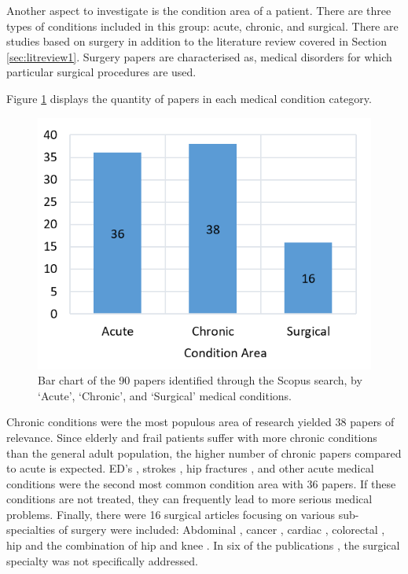 \documentclass[../thesis.tex]{subfiles}
\begin{document}
Another aspect to investigate is the condition area of a patient. There are three types of conditions included in this group: acute, chronic, and surgical. There are studies based on surgery in addition to the literature review covered in Section \ref{sec:litreview1}. Surgery papers are characterised as, medical disorders for which particular surgical procedures are used.

Figure \ref{fig:litreview2-condition} displays the quantity of papers in each medical condition category.

\begin{figure}[h!]
    \centering
    \includegraphics[scale=1]{Chapters/Chapter2/Figures3/2lrmedcon.png}
    \caption{Bar chart of the 90 papers identified through the Scopus search, by `Acute', `Chronic', and `Surgical' medical conditions.}
    \label{fig:litreview2-condition}
\end{figure}

Chronic conditions were the most populous area of research yielded 38 papers of relevance. Since elderly and frail patients suffer with more chronic conditions than the general adult population, the higher number of chronic papers compared to acute is expected. ED's \cite{Bahrmann2018}, strokes \cite{Sommerfeld2011}, hip fractures \cite{Rajamaki2020}, and other acute medical conditions were the second most common condition area with 36 papers. If these conditions are not treated, they can frequently lead to more serious medical problems. Finally, there were 16 surgical articles focusing on various sub-specialties of surgery were included: Abdominal \cite{Marano2022}, cancer \cite{Raab2022}, cardiac \cite{Cacciatore2012,Kirfel2021,Lee2010,Pustavoitau2016}, colorectal \cite{AgasiIdenburg2019}, hip \cite{Justo2011,Willems2012} and the combination of hip and knee \cite{MacDonald2010}. In six of the publications \cite{Harvey2020,Jones2021,Kerr2006, Zattoni2018, Zhao2020, Zhao2020a}, the surgical specialty was not specifically addressed.
\end{document}
